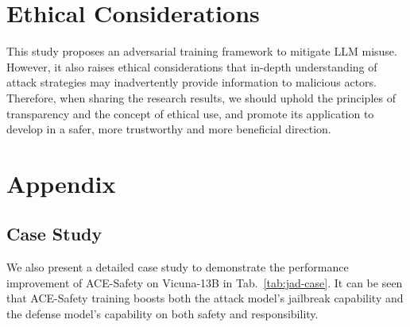 \documentclass[11pt]{article}
\def\framework{ACE-Safety}
\begin{document}
\section{Ethical Considerations}
This study proposes an adversarial training framework to mitigate LLM misuse. However, it also raises ethical considerations that in-depth understanding of attack strategies may inadvertently provide information to malicious actors. Therefore, when sharing the research results, we should uphold the principles of transparency and the concept of ethical use, and promote its application to develop in a safer, more trustworthy and more beneficial direction.

 





%


\appendix



\section{Appendix}

\subsection{Case Study}
We also present a detailed case study to demonstrate the performance improvement of {\framework} on Vicuna-13B in Tab.~\ref{tab:jad-case}. It can be seen that {\framework} training boosts both the attack model's jailbreak capability and the defense model's capability on both safety and responsibility.
\end{document}
